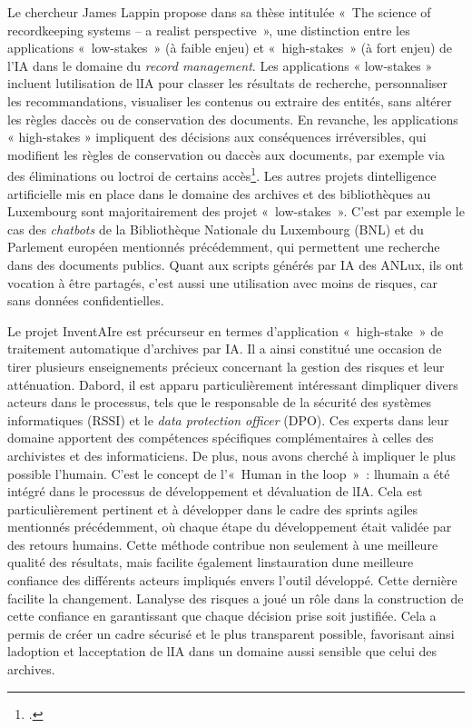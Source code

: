 Le chercheur James Lappin propose dans sa thèse intitulée «~The science
of recordkeeping systems -- a realist perspective~», une distinction
entre les applications «~low-stakes~» (à faible enjeu) et
«~high-stakes~» (à fort enjeu) de l'IA dans le domaine du \emph{record
	management}. Les applications « low-stakes » incluent
l\textquotesingle utilisation de l\textquotesingle IA pour classer les
résultats de recherche, personnaliser les recommandations, visualiser
les contenus ou extraire des entités, sans altérer les règles
d\textquotesingle accès ou de conservation des documents. En revanche,
les applications « high-stakes » impliquent des décisions aux
conséquences irréversibles, qui modifient les règles de conservation ou
d\textquotesingle accès aux documents, par exemple via des éliminations ou
l\textquotesingle octroi de certains accès\footcite{lappin_science_2024}. Les autres projets
d\textquotesingle intelligence artificielle mis en place dans le domaine
des archives et des bibliothèques au Luxembourg sont majoritairement des
projet «~low-stakes~». C'est par exemple le cas des \emph{chatbots} de la
Bibliothèque Nationale du Luxembourg (BNL) et du Parlement européen
mentionnés précédemment, qui permettent une recherche dans des documents
publics. Quant aux scripts générés par IA des ANLux, ils ont vocation à être
partagés, c'est aussi une utilisation avec moins de risques, car sans données confidentielles. 

Le projet
InventAIre est précurseur en termes d'application
«~high-stake~» de traitement automatique d'archives par IA. Il a ainsi constitué
une occasion de tirer plusieurs enseignements précieux concernant la
gestion des risques et leur atténuation. D\textquotesingle abord, il est
apparu particulièrement intéressant d\textquotesingle impliquer divers
acteurs dans le processus, tels que le responsable de la sécurité des
systèmes informatiques (RSSI) et le \emph{data protection officer} (DPO). Ces experts dans leur domaine
apportent des compétences spécifiques complémentaires à celles des
archivistes et des informaticiens. De plus, nous avons cherché à
impliquer le plus possible l'humain. C'est le concept de l'«~Human in
the loop~»~: l\textquotesingle humain a été intégré dans le processus de
développement et d\textquotesingle évaluation de l\textquotesingle IA.
Cela est particulièrement pertinent et à développer dans le cadre des
sprints agiles mentionnés précédemment, où chaque étape du développement
était validée par des retours humains. Cette méthode contribue non seulement à une meilleure
qualité des résultats, mais facilite également
l\textquotesingle instauration d\textquotesingle une meilleure confiance
des différents acteurs impliqués envers l'outil développé. Cette dernière facilite la \gls{changement}.
L\textquotesingle analyse des risques a joué un rôle dans la
construction de cette confiance en garantissant que chaque décision
prise soit justifiée. Cela a permis de créer un cadre sécurisé et le
plus transparent possible, favorisant ainsi l\textquotesingle adoption
et l\textquotesingle acceptation de l\textquotesingle IA dans un domaine
aussi sensible que celui des archives.

